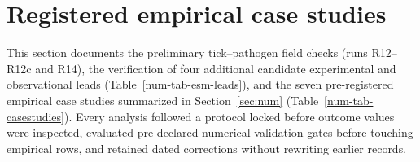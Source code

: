 \section{Registered empirical case studies}\label{num-esm-casestudies}

This section documents the preliminary tick--pathogen field checks (runs R12--R12c and R14), the verification of four additional candidate experimental and observational leads (Table~\ref{num-tab-esm-leads}), and the seven pre-registered empirical case studies summarized in Section~\ref{sec:num} (Table~\ref{num-tab-casestudies}). Every analysis followed a protocol locked before outcome values were inspected, evaluated pre-declared numerical validation gates before touching empirical rows, and retained dated corrections without rewriting earlier records.

